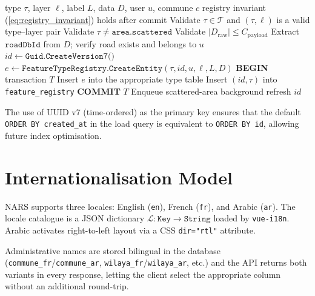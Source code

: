 \documentclass[12pt,a4paper]{article}
\theoremstyle{definition}
\theoremstyle{plain}
\theoremstyle{remark}
\newcommand{\abs}[1]{\left\lvert #1 \right\rvert}
\begin{document}
\begin{algorithm}[H]
\caption{SaveFeature transactional protocol}
\label{alg:save}
\begin{algorithmic}[1]
\Require type $\tau$, layer $\ell$, label $L$, data $D$, user $u$, commune $c$
\Ensure registry invariant (\ref{eq:registry_invariant}) holds after commit
\State Validate $\tau \in \mathcal{T}$ and $(\tau, \ell)$ is a valid type--layer pair
\State Validate $\tau \neq \texttt{area.scattered}$ 
\State Validate $\abs{D_{\text{raw}}} \leq C_{\text{payload}}$ 
  \State Extract $\texttt{roadDbId}$ from $D$; verify road exists and belongs to $u$
\EndIf
\State $\mathit{id} \leftarrow \texttt{Guid.CreateVersion7()}$ 
\State $e \leftarrow \texttt{FeatureTypeRegistry.CreateEntity}(\tau, \mathit{id}, u, \ell, L, D)$
\State \textbf{BEGIN} transaction $T$
\State Insert $e$ into the appropriate type table
\State Insert $(\mathit{id}, \tau)$ into \texttt{feature\_registry}
\State \textbf{COMMIT} $T$
  \State Enqueue scattered-area background refresh
\EndIf
\State \Return $\mathit{id}$
\end{algorithmic}
\end{algorithm}

The use of UUID v7 (time-ordered) as the primary key ensures that
the default \texttt{ORDER BY created\_at} in the load query is equivalent
to \texttt{ORDER BY id}, allowing future index optimisation.

\section{Internationalisation Model}
\label{sec:i18n}

NARS supports three locales: English (\texttt{en}), French (\texttt{fr}),
and Arabic (\texttt{ar}). The locale catalogue is a JSON dictionary
$\mathcal{L}: \texttt{Key} \to \texttt{String}$ loaded by \texttt{vue-i18n}.
Arabic activates right-to-left layout via a CSS \texttt{dir="rtl"} attribute.

Administrative names are stored bilingual in the database
(\texttt{commune\_fr}/\texttt{commune\_ar},
\texttt{wilaya\_fr}/\texttt{wilaya\_ar}, etc.) and the API returns both
variants in every response, letting the client select the appropriate
column without an additional round-trip.
\end{document}
